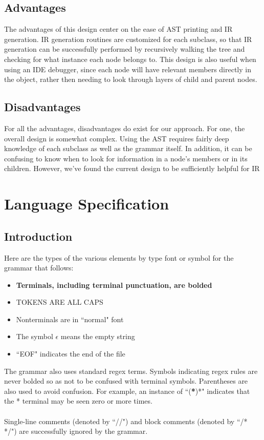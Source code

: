 \documentclass{scrartcl}
\begin{document}
\subsection{Advantages}
The advantages of this design center on the ease of AST printing and IR generation. IR generation routines are customized for each subclass, so that IR generation can be successfully performed by recursively walking the tree and checking for what instance each node belongs to. This design is also useful when using an IDE debugger, since each node will have relevant members directly in the object, rather then needing to look through layers of child and parent nodes.\\
\subsection{Disadvantages}
For all the advantages, disadvantages do exist for our approach. For one, the overall design is somewhat complex. Using the AST requires fairly deep knowledge of each subclass as well as the grammar itself. In addition, it can be confusing to know when to look for information in a node's members or in its children. However, we've found the current design to be sufficiently helpful for IR 

\section{Language Specification}
\subsection{Introduction}
Here are the types of the various elements by type font or symbol for the grammar that follows:
\begin{itemize}
    \item \textbf{Terminals, including terminal punctuation, are bolded}
    \item TOKENS ARE ALL CAPS
    \item Nonterminals are in ``normal" font
    \item The symbol $\epsilon$ means the empty string
    \item ``EOF" indicates the end of the file
\end{itemize}
The grammar also uses standard regex terms. Symbols indicating regex rules are never bolded so as not to be confused with terminal symbols. Parentheses are also used to avoid confusion. For example, an instance of ``(\textbf{*})*" indicates that the * terminal may be seen zero or more times.\\
\\
Single-line comments (denoted by ``//") and block comments (denoted by ``/* */") are successfully ignored by the grammar.
\end{document}
